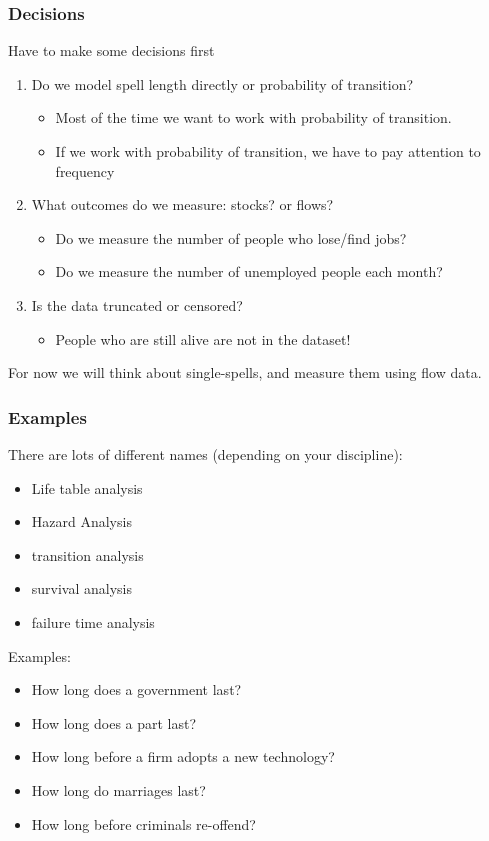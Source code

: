 \documentclass[aspectratio=169]{beamer}
\begin{document}
\begin{frame}
\frametitle{Decisions}
Have to make some decisions first
\begin{enumerate}
\item Do we model \alert{spell length} directly or \alert{probability of transition}?
\begin{itemize}
\item Most of the time we want to work with probability of transition.
\item If we work with probability of transition, we have to pay attention to \alert{frequency}
\end{itemize}
\item What outcomes do we measure: \alert{stocks}? or \alert{flows}?
\begin{itemize}
\item Do we measure the number of people who lose/find jobs?
\item Do we measure the number of unemployed people each month?
\end{itemize}
\item Is the data \alert{truncated} or \alert{censored}?
\begin{itemize}
\item People who are still alive are not in the dataset!
\end{itemize}
\end{enumerate}
For now we will think about \alert{single-spells}, and measure them using \alert{flow data}.
\end{frame}

\begin{frame}
\frametitle{Examples}
There are lots of different names (depending on your discipline):
\begin{itemize}
\item Life table analysis
\item Hazard Analysis
\item transition analysis
\item survival analysis
\item failure time analysis
\end{itemize}
Examples:
\begin{itemize}
\item How long does a government last?
\item How long does a part last?
\item How long before a firm adopts a new technology?
\item How long do marriages last?
\item How long before criminals re-offend?
\end{itemize}
\end{frame}
\end{document}
